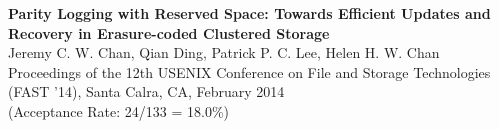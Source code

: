 \noindent \textbf{Parity Logging with Reserved Space: Towards Efficient Updates and Recovery in Erasure-coded Clustered Storage}\\
Jeremy C. W. Chan, Qian Ding, Patrick P. C. Lee, Helen H. W. Chan\\
Proceedings of the 12th USENIX Conference on File and Storage Technologies (FAST '14), Santa Calra, CA, February 2014\\
(Acceptance Rate: 24/133 = 18.0\%)

